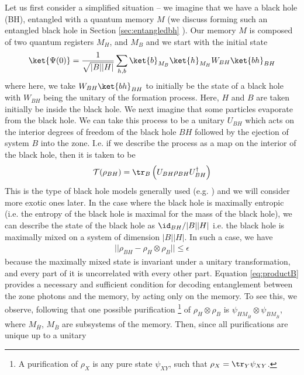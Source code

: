 \documentclass[12pt,a4paper]{article}
\begin{document}
Let us first consider a simplified situation -- we imagine that we have a black hole (BH), entangled with a quantum memory $M$ (we discuss forming such an entangled black hole in Section \ref{sec:entangledbh} ). Our memory $M$ is composed of two quantum registers $M_H$, and $M_B$  and we start with the initial state
\begin{align}
\ket{\Psi(0)}=\frac{1}{\sqrt{|B||H|}}
\sum_{h,b}\ket{b}_{M_B}\ket{h}_{M_H} W_{BH} \ket{bh}_{BH}
\label{eq:initial}
\end{align}
where here, we take $W_{BH}\ket{bh}_{BH}$ to initially be the state of a black hole with $W_{BH}$ being the unitary of the formation
process.  Here, $H$ and $B$ are taken initially be inside the black hole.  
We next imagine that some particles evaporate from the black hole. We can take this process to be a unitary $U_{BH}$ which acts on the interior degrees of freedom of the black hole $BH$ followed by the ejection of system $B$ into the zone.  I.e. if we describe the process as a map on the interior of the black hole, then it is taken to be
\begin{align}
{\cal T}(\rho_{BH})=\tr_B \left( U_{BH}\rho_{BH}U^\dagger_{BH}\right)
\label{eq:page-map}
\end{align}
This is the type of black hole models generally used (e.g. \cite{page-unitary-evap,bhlock,HaydenPreskill,sekino2008fast,giddings2013quantum}) and we will consider more exotic ones later.  In the case where the black hole is maximally entropic (i.e. the entropy of the black hole is maximal for the mass of the black hole), we can describe the state of the black hole as $\id_{BH}/|B||H|$ i.e. the black hole is maximally mixed on a system of dimension $|B||H|$. In such a case, we have 
\begin{align}
||\rho_{BH}-\rho_{H}\otimes\rho_{B}||\leq \epsilon
\label{eq:productB}
\end{align}
because the maximally mixed state is invariant under a unitary transformation, and every part of it is uncorrelated with every other part. 
Equation \eqref{eq:productB} provides a necessary and sufficient condition for decoding entanglement between the zone photons and the memory, by acting only on the memory. To see this, we observe, following\cite{how-merge,how-merge2} that one possible purification
\footnote{A purification of $\rho_X$ is any pure state $\psi_{XY}$, such that $\rho_X=\tr_Y\psi_{XY}$.}
 of $\rho_{H}\otimes\rho_{B}$ is $\psi_{HM_{\overline{H}}}\otimes
\psi_{BM_{\overline{B}}}$,  where $M_{\overline{H}}$, $M_{\overline{B}}$ are subsystems of the memory. Then, since all purifications are unique up to a unitary
\end{document}
